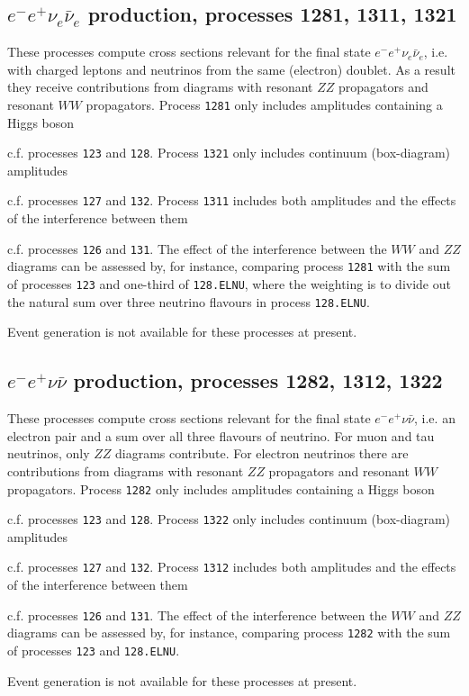 \documentclass{article}
\begin{document}
\subsection{$e^- e^+ \nu_e \bar \nu_e$ production, processes 1281, 1311, 1321}
These processes compute cross sections relevant for the final state
$e^- e^+ \nu_e \bar \nu_e$, i.e. with charged leptons and neutrinos from the
same (electron) doublet.  As a result they receive contributions from diagrams
with resonant $ZZ$ propagators and resonant $WW$ propagators.  Process
{\tt 1281} only includes amplitudes containing a Higgs boson {c.f. processes
{\tt 123} and {\tt 128}. Process
{\tt 1321} only includes continuum (box-diagram) amplitudes {c.f. processes
{\tt 127} and {\tt 132}. Process
{\tt 1311} includes both amplitudes and the effects of the interference
between them {c.f. processes {\tt 126} and {\tt 131}.
The effect of the interference between the $WW$ and $ZZ$ diagrams can be assessed
by, for instance, comparing process {\tt 1281} with the sum of processes
{\tt 123} and one-third of {\tt 128.ELNU}, where the weighting is to divide out
the natural sum over three neutrino flavours in process {\tt 128.ELNU}.

Event generation is not available for these processes at present.

\subsection{$e^- e^+ \nu \bar \nu$ production, processes 1282, 1312, 1322}
These processes compute cross sections relevant for the final state
$e^- e^+ \nu \bar \nu$, i.e. an electron pair and a sum over all three
flavours of neutrino.  For muon and tau neutrinos, only $ZZ$ diagrams
contribute.  For electron neutrinos there are contributions from diagrams
with resonant $ZZ$ propagators and resonant $WW$ propagators.  Process
{\tt 1282} only includes amplitudes containing a Higgs boson {c.f. processes
{\tt 123} and {\tt 128}. Process
{\tt 1322} only includes continuum (box-diagram) amplitudes {c.f. processes
{\tt 127} and {\tt 132}. Process
{\tt 1312} includes both amplitudes and the effects of the interference
between them {c.f. processes {\tt 126} and {\tt 131}.
The effect of the interference between the $WW$ and $ZZ$ diagrams can be assessed
by, for instance, comparing process {\tt 1282} with the sum of processes
{\tt 123} and {\tt 128.ELNU}.

Event generation is not available for these processes at present.


}}}}}}
\end{document}
